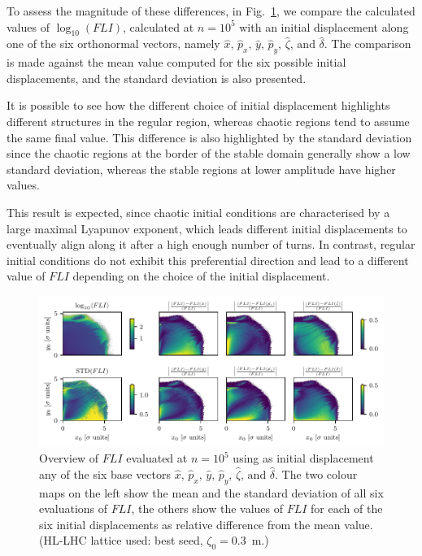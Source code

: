 To assess the magnitude of these differences, in Fig.~\ref{fig:fli_compare}, we compare the calculated values of $\log_{10}({FLI})$, calculated at $n=10^5$ with an initial displacement along one of the six orthonormal vectors, namely $\hat{x},\,\hat{p}_x,\,\hat{y},\,\hat{p}_y,\,\hat{\zeta},\,\text{and }\hat{\delta}$. The comparison is made against the mean value computed for the six possible initial displacements, and the standard deviation is also presented.

It is possible to see how the different choice of initial displacement highlights different structures in the regular region, whereas chaotic regions tend to assume the same final value. This difference is also highlighted by the standard deviation since the chaotic regions at the border of the stable domain generally show a low standard deviation, whereas the stable regions at lower amplitude have higher values.

This result is expected, since chaotic initial conditions are characterised by a large maximal Lyapunov exponent, which leads different initial displacements to eventually align along it after a high enough number of turns. In contrast, regular initial conditions do not exhibit this preferential direction and lead to a different value of $FLI$ depending on the choice of the initial displacement.

\begin{figure}[htp]
    \centering
    \includegraphics[width=1.0\textwidth]{6_lhc_dynamic_indicators/figs/LE_FLI_high_main_idx_8.pdf}
    \caption{Overview of $FLI$ evaluated at $n=10^5$ using as initial displacement any of the six base vectors $\hat{x},\,\hat{p}_x,\,\hat{y},\,\hat{p}_y,\,\hat{\zeta},\,\text{and }\hat{\delta}$. The two colour maps on the left show the mean and the standard deviation of all six evaluations of $FLI$, the others show the values of $FLI$ for each of the six initial displacements as relative difference from the mean value. (HL-LHC lattice used: best seed, $\zeta_0=$\SI{0.3}{\meter}.)}
    \label{fig:fli_compare}
\end{figure}

